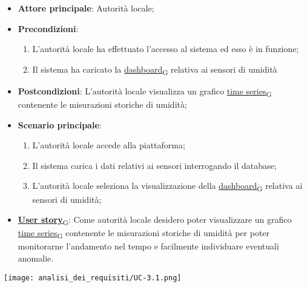 \begin{itemize}
	\item \textbf{Attore principale}: Autorità locale;
	\item \textbf{Precondizioni}:
	      \begin{enumerate}
		      \item L'autorità locale ha effettuato l'accesso al sistema ed esso è in funzione;
		      \item Il sistema ha caricato la \href{https://7last.github.io/docs/rtb/documentazione-interna/glossario\#dashboard}{dashboard\textsubscript{G}} relativa ai sensori di umidità
	      \end{enumerate}
	\item \textbf{Postcondizioni}: L'autorità locale visualizza un grafico \href{https://7last.github.io/docs/rtb/documentazione-interna/glossario\#time-series}{time series\textsubscript{G}} contenente le misurazioni storiche
	      di umidità;
	\item \textbf{Scenario principale}:
	      \begin{enumerate}
		      \item L'autorità locale accede alla piattaforma;
		      \item Il sistema carica i dati relativi ai sensori interrogando il database;
		      \item L'autorità locale seleziona la visualizzazione della \href{https://7last.github.io/docs/rtb/documentazione-interna/glossario\#dashboard}{dashboard\textsubscript{G}} relativa ai sensori di umidità;
	      \end{enumerate}
	\item \href{https://7last.github.io/docs/rtb/documentazione-interna/glossario\#user-story}{\textbf{User story}\textsubscript{G}}:
	      Come autorità locale desidero poter visualizzare un grafico \href{https://7last.github.io/docs/rtb/documentazione-interna/glossario\#time-series}{time series\textsubscript{G}} contenente le misurazioni storiche
	      di umidità per poter monitorarne l'andamento nel tempo e facilmente individuare eventuali anomalie.
\end{itemize}
\begin{center}
	\texttt{[image: analisi\_dei\_requisiti/UC-3.1.png]}
\end{center}

